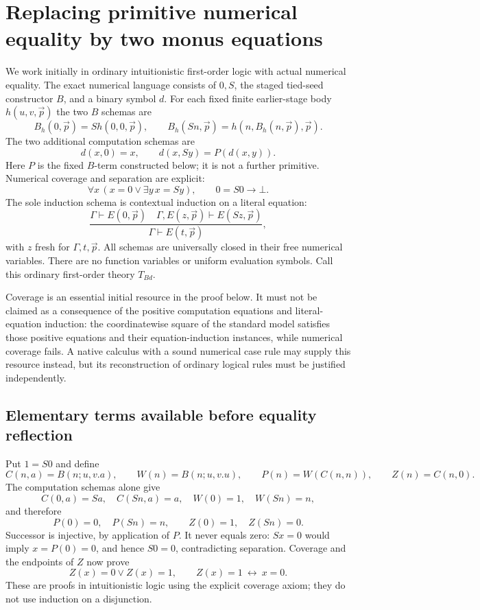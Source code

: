\section{Replacing primitive numerical equality by two monus equations}
\label{sec:monus-basis}

We work initially in ordinary intuitionistic first-order logic with actual
numerical equality. The exact numerical language consists of $0,S$, the
staged tied-seed constructor $B$, and a binary symbol $d$. For each fixed
finite earlier-stage body $h(u,v,\vec p)$ the two $B$ schemas are
\[
 B_h(0,\vec p)=S h(0,0,\vec p),\qquad
 B_h(Sn,\vec p)=h(n,B_h(n,\vec p),\vec p).
 \tag{B}
\]
The two additional computation schemas are
\[
 d(x,0)=x,\qquad d(x,Sy)=P(d(x,y)).
 \tag{M}\label{monus:M}
\]
Here $P$ is the fixed $B$-term constructed below; it is not a further
primitive. Numerical coverage and separation are explicit:
\[
 \forall x\,(x=0\lor\exists y\,x=Sy),\qquad 0=S0\to\bot.
 \tag{CS}\label{monus:CS}
\]
The sole induction schema is contextual induction on a literal equation:
\[
 \frac{\Gamma\vdash E(0,\vec p)\quad
       \Gamma,E(z,\vec p)\vdash E(Sz,\vec p)}
      {\Gamma\vdash E(t,\vec p)},
 \tag{EI}\label{monus:EI}
\]
with $z$ fresh for $\Gamma,t,\vec p$. All schemas are universally closed
in their free numerical variables. There are no function variables or
uniform evaluation symbols. Call this ordinary first-order theory $T_{Bd}$.

Coverage is an essential initial resource in the proof below. It must not
be claimed as a consequence of the positive computation equations and
literal-equation induction: the coordinatewise square of the standard
model satisfies those positive equations and their equation-induction
instances, while numerical coverage fails. A native calculus with a sound
numerical case rule may supply this resource instead, but its reconstruction
of ordinary logical rules must be justified independently.

\subsection{Elementary terms available before equality reflection}
Put $1=S0$ and define
\[
 C(n,a)=B(n;u,v.a),\qquad W(n)=B(n;u,v.u),\qquad
 P(n)=W(C(n,n)),\qquad Z(n)=C(n,0).
\]
The computation schemas alone give
\[
 C(0,a)=Sa,\quad C(Sn,a)=a,\quad W(0)=1,\quad W(Sn)=n,
\]
and therefore
\[
 P(0)=0,\quad P(Sn)=n,\qquad Z(0)=1,\quad Z(Sn)=0.
 \tag{PZ}\label{monus:PZ}
\]
Successor is injective, by application of $P$. It never equals zero:
$Sx=0$ would imply $x=P(0)=0$, and hence $S0=0$, contradicting
separation. Coverage and the endpoints of $Z$ now prove
\[
 Z(x)=0\lor Z(x)=1,\qquad Z(x)=1\ \longleftrightarrow\ x=0.
 \tag{Z}\label{monus:Z}
\]
These are proofs in intuitionistic logic using the explicit coverage axiom;
they do not use induction on a disjunction.

